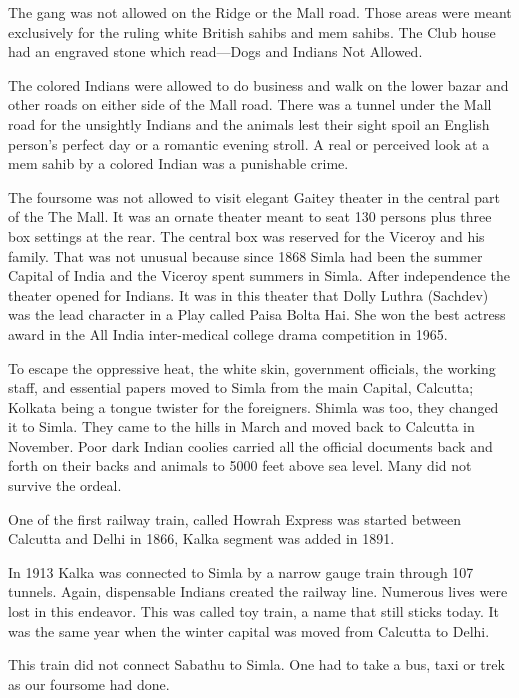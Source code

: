 The gang was not allowed on the Ridge or the Mall road. Those areas were meant exclusively for the ruling white British sahibs and mem sahibs. The Club house had an engraved stone which read—Dogs and Indians Not Allowed. 

The colored Indians were allowed to do business and walk on the lower bazar and other roads on either side of the Mall road. There was a tunnel under the Mall road for the unsightly Indians and the animals lest their sight spoil an English person's perfect day or a romantic evening stroll. A real or perceived look at a mem sahib by a colored Indian was a punishable crime. 

The foursome was not allowed to visit elegant Gaitey theater in the central part of the The Mall. It was an ornate theater meant to seat 130 persons plus three box settings at the rear. The central box was reserved for the Viceroy and his family. That was not unusual because since 1868 Simla had been the summer Capital of India and the Viceroy spent summers in Simla. After independence the theater opened for Indians. It was in this theater that Dolly Luthra (Sachdev)
was the lead character in a Play called Paisa Bolta Hai. She won the best actress award in the All India inter-medical college drama competition in 1965. 

To escape the oppressive heat, the white skin, government officials, the working staff, and essential papers moved to Simla from the main Capital, Calcutta; Kolkata being a tongue twister for the foreigners. Shimla was too, they changed it to Simla. They came to the hills in March and moved back to Calcutta in November. Poor dark Indian coolies carried all the official documents back and forth on their backs and animals to 5000 feet above sea level. Many did not survive the ordeal. 

One of the first railway train, called Howrah Express was started between Calcutta and Delhi in 1866, Kalka segment was added in 1891.

In 1913 Kalka was connected to Simla by a narrow gauge train through 107 tunnels. Again, dispensable Indians created the railway line. Numerous lives were lost in this endeavor. This was called toy train, a name that still sticks today. It was the same year when the winter capital was moved from Calcutta to Delhi. 

This train did not connect Sabathu to Simla. One had to take a bus, taxi or trek as our foursome had done. 

